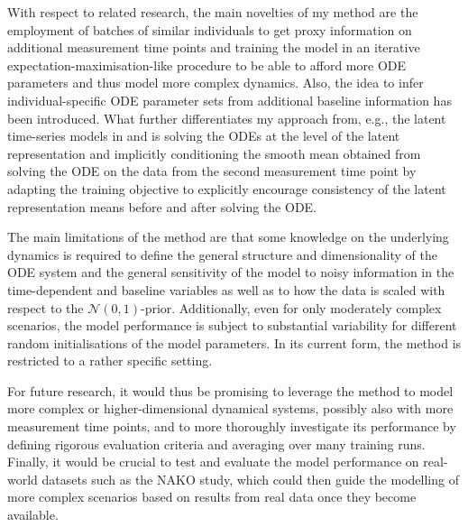 With respect to related research, the main novelties of my method are the employment of batches of similar individuals to get proxy information on additional measurement time points and training the model in an iterative expectation-maximisation-like procedure to be able to afford more ODE parameters and thus model more complex dynamics. Also, the idea to infer individual-specific ODE parameter sets from additional baseline information has been introduced. What further differentiates my approach from, e.g., the latent time-series models in \cite{Chen2018} and \cite{Rubanova2019} is solving the ODEs at the level of the latent representation and implicitly conditioning the smooth mean obtained from solving the ODE on the data from the second measurement time point by adapting the training objective to explicitly encourage consistency of the latent representation means before and after solving the ODE. 
 
The main limitations of the method are that some knowledge on the underlying dynamics is required to define the general structure and dimensionality of the ODE system and the general sensitivity of the model to noisy information in the time-dependent and baseline variables as well as to how the data is scaled with respect to the $\mathcal{N}(0,1)$-prior. Additionally, even for only moderately complex scenarios, the model performance is subject to substantial variability for different random initialisations of the model parameters. In its current form, the method is restricted to a rather specific setting. 

For future research, it would thus be promising to leverage the method to model more complex or higher-dimensional dynamical systems, possibly also with more measurement time points, and to more thoroughly investigate its performance by defining rigorous evaluation criteria and averaging over many training runs. Finally, it would be crucial to test and evaluate the model performance on real-world datasets such as the NAKO study, which could then guide the modelling of more complex scenarios based on results from real data once they become available.
